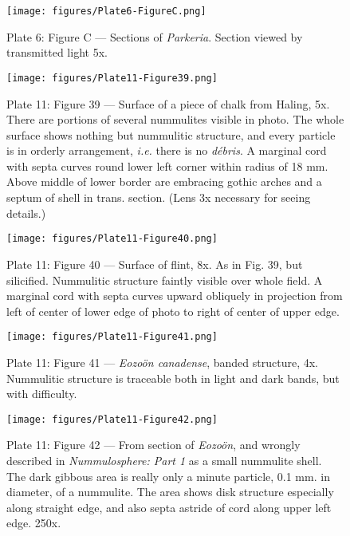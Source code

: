 \documentclass[a4paper, 12pt, oneside]{article}
\begin{document}
\clearpage
\begin{figure}[b]
\centering
\texttt{[image: figures/Plate6-FigureC.png]}
\caption{\small Plate 6: Figure C --- Sections of \emph{Parkeria}. Section viewed by transmitted light 5x.}
\end{figure}
\clearpage
{}
\cfoot{\thepage}
\begin{figure}[b]
\centering
\texttt{[image: figures/Plate11-Figure39.png]}
\caption{\small Plate 11: Figure 39 --- Surface of a piece of chalk from Haling, 5x. There are portions of several nummulites visible in photo. The whole surface shows nothing but nummulitic structure, and every particle is in orderly arrangement, \emph{i.e.} there is no \emph{débris}. A marginal cord with septa curves round lower left corner within radius of 18 mm. Above middle of lower border are embracing gothic arches and a septum of shell in trans. section. (Lens 3x necessary for seeing details.)}
\end{figure}
\clearpage
\begin{figure}[b]
\centering
\texttt{[image: figures/Plate11-Figure40.png]}
\caption{\small Plate 11: Figure 40 --- Surface of flint, 8x. As in Fig. 39, but silicified. Nummulitic structure faintly visible over whole field. A marginal cord with septa curves upward obliquely in projection from left of center of lower edge of photo to right of center of upper edge.}
\end{figure}
\clearpage
\begin{figure}[b]
\centering
\texttt{[image: figures/Plate11-Figure41.png]}
\caption{\small Plate 11: Figure 41 --- \emph{Eozoön canadense}, banded structure, 4x. Nummulitic structure is traceable both in light and dark bands, but with difficulty.}
\end{figure}
\clearpage
\begin{figure}[b]
\centering
\texttt{[image: figures/Plate11-Figure42.png]}
\caption{\small Plate 11: Figure 42 --- From section of \emph{Eozoön}, and wrongly described in \emph{Nummulosphere: Part 1} as a small nummulite shell. The dark gibbous area is really only a minute particle, 0.1 mm. in diameter, of a nummulite. The area shows disk structure especially along straight edge, and also septa astride of cord along upper left edge. 250x.}
\end{figure}
\end{document}
